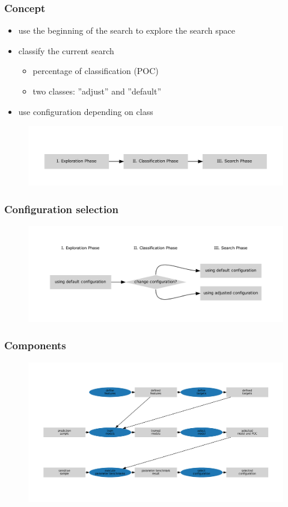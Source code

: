 \begin{frame}
	\frametitle{Concept}
	
	\begin{itemize}
		\item use the beginning of the search to explore the search space
		\item classify the current search 
		\begin{itemize}
			\item percentage of classification (POC)
			\item two classes: ''adjust'' and ''default''
		\end{itemize}
		\item use configuration depending on class
	\end{itemize}
	
	\begin{figure}
		\includegraphics[width=1\textwidth]{figures/flowchart_phases}
	\end{figure}
	
\end{frame}

\begin{frame}
	\frametitle{Configuration selection}
	
	\begin{figure}
		\includegraphics[width=1\textwidth]{figures/flowchart_decision}
	\end{figure}
	
\end{frame}

\begin{frame}
	\frametitle{Components}
	
	\begin{figure}
		\includegraphics[width=1\textwidth]{figures/flowchart_component_search}
	\end{figure}
	
\end{frame}